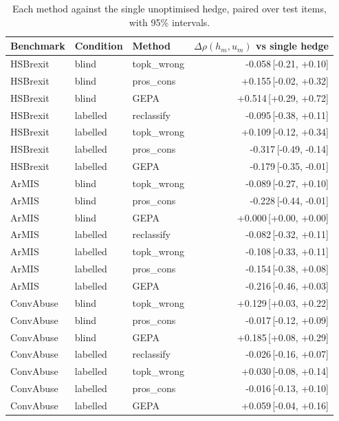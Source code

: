 \begin{table}[t]
\centering
\small
\begin{tabular}{lllr}
\hline
Benchmark & Condition & Method & $\Delta\rho(h_m,u_m)$ vs single hedge \\
\hline
HSBrexit & blind & topk\_wrong & -0.058{\scriptsize\,[-0.21, +0.10]} \\
HSBrexit & blind & pros\_cons & +0.155{\scriptsize\,[-0.02, +0.32]} \\
HSBrexit & blind & GEPA & +0.514{\scriptsize\,[+0.29, +0.72]} \\
HSBrexit & labelled & reclassify & -0.095{\scriptsize\,[-0.38, +0.11]} \\
HSBrexit & labelled & topk\_wrong & +0.109{\scriptsize\,[-0.12, +0.34]} \\
HSBrexit & labelled & pros\_cons & -0.317{\scriptsize\,[-0.49, -0.14]} \\
HSBrexit & labelled & GEPA & -0.179{\scriptsize\,[-0.35, -0.01]} \\
ArMIS & blind & topk\_wrong & -0.089{\scriptsize\,[-0.27, +0.10]} \\
ArMIS & blind & pros\_cons & -0.228{\scriptsize\,[-0.44, -0.01]} \\
ArMIS & blind & GEPA & +0.000{\scriptsize\,[+0.00, +0.00]} \\
ArMIS & labelled & reclassify & -0.082{\scriptsize\,[-0.32, +0.11]} \\
ArMIS & labelled & topk\_wrong & -0.108{\scriptsize\,[-0.33, +0.11]} \\
ArMIS & labelled & pros\_cons & -0.154{\scriptsize\,[-0.38, +0.08]} \\
ArMIS & labelled & GEPA & -0.216{\scriptsize\,[-0.46, +0.03]} \\
ConvAbuse & blind & topk\_wrong & +0.129{\scriptsize\,[+0.03, +0.22]} \\
ConvAbuse & blind & pros\_cons & -0.017{\scriptsize\,[-0.12, +0.09]} \\
ConvAbuse & blind & GEPA & +0.185{\scriptsize\,[+0.08, +0.29]} \\
ConvAbuse & labelled & reclassify & -0.026{\scriptsize\,[-0.16, +0.07]} \\
ConvAbuse & labelled & topk\_wrong & +0.030{\scriptsize\,[-0.08, +0.14]} \\
ConvAbuse & labelled & pros\_cons & -0.016{\scriptsize\,[-0.13, +0.10]} \\
ConvAbuse & labelled & GEPA & +0.059{\scriptsize\,[-0.04, +0.16]} \\
\hline
\end{tabular}
\caption{Each method against the single unoptimised hedge, paired over test items, with 95\% intervals.}
\label{tab:paired-methods}
\end{table}
